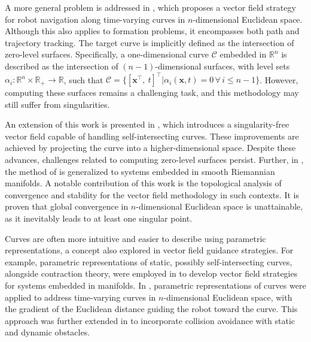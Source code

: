 A more general problem  is addressed in \citet{goncalves2010vectorfield}, which proposes a vector field strategy for robot navigation along time-varying curves in $n$-dimensional Euclidean space. Although this also applies to formation problems, it encompasses both path and trajectory tracking. The target curve is implicitly defined as the intersection of zero-level surfaces. Specifically, a one-dimensional curve $\mathcal{C}$ embedded in $\mathbb{R}^n$ is described as the intersection of $(n-1)$-dimensional surfaces, with level sets $\alpha_i:\mathbb{R}^n\times\mathbb{R}_+\to\mathbb{R}$, such that $\mathcal{C} = \{ [ \mathbf{x}^\top,\ t]^\top | \alpha_i(\mathbf{x}, t) = 0\,\forall\,i\le n-1 \}$. However, computing these surfaces remains a challenging task, and this methodology may still suffer from singularities.

An extension of this work is presented in \citet{yao2021singularity}, which introduces a singularity-free vector field capable of handling self-intersecting curves. These improvements are achieved by projecting the curve into a higher-dimensional space. Despite these advances, challenges related to computing zero-level surfaces persist. Further, in \citet{yao2022topological}, the method of \citet{goncalves2010vectorfield} is generalized to systems embedded in smooth Riemannian manifolds. A notable contribution of this work is the topological analysis of convergence and stability for the vector field methodology in such contexts. It is proven that global convergence in $n$-dimensional Euclidean space is unattainable, as it inevitably leads to at least one singular point.

Curves are often more intuitive and easier to describe using parametric representations, a concept also explored in vector field guidance strategies. For example, parametric representations of static, possibly self-intersecting curves, alongside contraction theory, were employed in \citet{Wu2018} to develop vector field strategies for systems embedded in manifolds. In \citet{Rezende2022}, parametric representations of curves were applied to address time-varying curves in $n$-dimensional Euclidean space, with the gradient of the Euclidean distance guiding the robot toward the curve. This approach was further extended in \citet{Nunes2022} to incorporate collision avoidance with static and dynamic obstacles.

